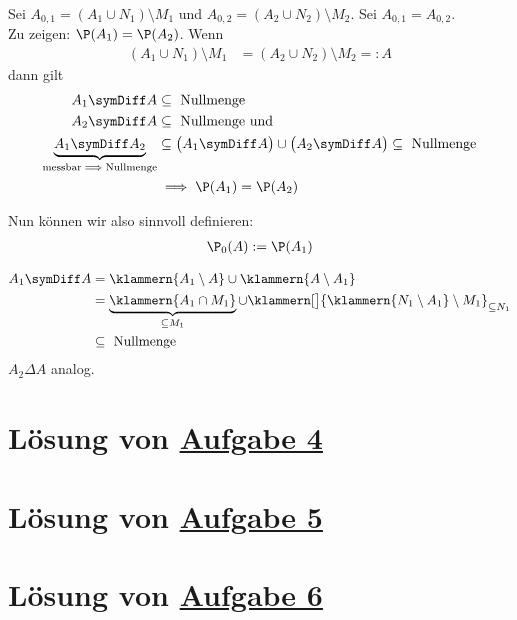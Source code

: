 \\
Sei $A_{0,1}=(A_1\cup N_1)\setminus M_1$ und $A_{0,2}=(A_2\cup N_2)\setminus M_2$.
Sei $A_{0,1}=A_{0,2}$.\\
Zu zeigen: $\P(A_1)=\P(A_2)$.
Wenn 
\begin{align*}
	(A_1\cup N_1)\setminus M_1
	&=(A_2\cup N_2)\setminus M_2=:A
\end{align*}
dann gilt
\begin{align*}
	A_1\symDiff A&\subseteq\text{ Nullmenge}\\
	A_2\symDiff A&\subseteq\text{ Nullmenge und}\\
	\underbrace{A_1\symDiff A_2}_{
		\text{messbar}\implies\text{Nullmenge}
	} &\subseteq\big(A_1\symDiff A\big)\cup\big(A_2\symDiff A\big)\subseteq\text{ Nullmenge}\\
	&\implies \P(A_1)=\P(A_2)
\end{align*}

Nun können wir also sinnvoll definieren:
\begin{align*}
	\P_0(A):=\P(A_1)
\end{align*}

\begin{align*}
	A_1\symDiff A
	&=\klammern{A_1\setminus A}\cup\klammern{A\setminus A_1}\\
	&=\underbrace{\klammern{A_1\cap M_1}}_{\subseteq M_1}\cup\klammern[\big]{\klammern{N_1\setminus A_1}\setminus M_1}_{\subseteq N_1}\\
	&\subseteq\text{ Nullmenge}
\end{align*}
$A_2\Delta A$ analog.



\section{Lösung von 
	\texorpdfstring{\hyperref[aufg:4]{Aufgabe 4}}{}
}\label{loes:4}

\section{Lösung von 
	\texorpdfstring{\hyperref[aufg:5]{Aufgabe 5}}{}
}\label{loes:5}

\section{Lösung von 
	\texorpdfstring{\hyperref[aufg:6]{Aufgabe 6}}{}
}\label{loes:6}


